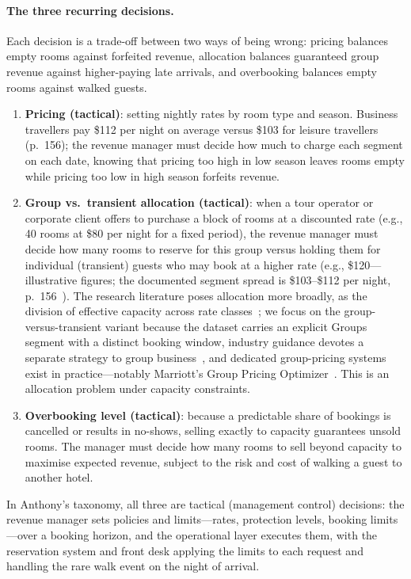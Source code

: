 \paragraph{The three recurring decisions.}
Each decision is a trade-off between two ways of being wrong: pricing balances empty rooms against forfeited revenue, allocation balances guaranteed group revenue against higher-paying late arrivals, and overbooking balances empty rooms against walked guests.
\begin{enumerate}
  \item \textbf{Pricing (tactical)}: setting nightly rates by room type and season. Business travellers pay \$112 per night on average versus \$103 for leisure travellers~\cite{goeldner2009} (p.~156); the revenue manager must decide how much to charge each segment on each date, knowing that pricing too high in low season leaves rooms empty while pricing too low in high season forfeits revenue.
  \item \textbf{Group vs.\ transient allocation (tactical)}: when a tour operator or corporate client offers to purchase a block of rooms at a discounted rate (e.g., 40 rooms at \$80 per night for a fixed period), the revenue manager must decide how many rooms to reserve for this group versus holding them for individual (transient) guests who may book at a higher rate (e.g., \$120---illustrative figures; the documented segment spread is \$103--\$112 per night, p.~156~\cite{goeldner2009}). The research literature poses allocation more broadly, as the division of effective capacity across rate classes~\cite{pimentel2019}; we focus on the group-versus-transient variant because the dataset carries an explicit Groups segment with a distinct booking window, industry guidance devotes a separate strategy to group business~\cite{amadeus2023}, and dedicated group-pricing systems exist in practice---notably Marriott's Group Pricing Optimizer~\cite{hormby2010}. This is an allocation problem under capacity constraints.
  \item \textbf{Overbooking level (tactical)}: because a predictable share of bookings is cancelled or results in no-shows, selling exactly to capacity guarantees unsold rooms. The manager must decide how many rooms to sell beyond capacity to maximise expected revenue, subject to the risk and cost of walking a guest to another hotel.
\end{enumerate}
In Anthony's taxonomy, all three are tactical (management control) decisions: the revenue manager sets policies and limits---rates, protection levels, booking limits---over a booking horizon, and the operational layer executes them, with the reservation system and front desk applying the limits to each request and handling the rare walk event on the night of arrival.

